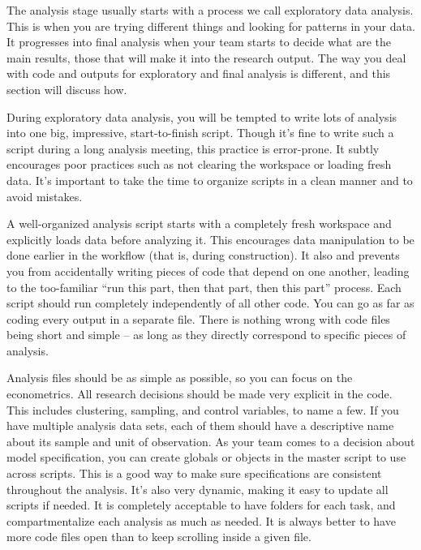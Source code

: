 The analysis stage usually starts with a process we call exploratory data analysis.
This is when you are trying different things and looking for patterns in your data. 
It progresses into final analysis when your team starts to decide what are the main results, those that will make it into the research output.
The way you deal with code and outputs for exploratory and final analysis is different, and this section will discuss how.

During exploratory data analysis, you will be tempted to write lots of analysis into one big, impressive, start-to-finish script. 
Though it's fine to write such a script during a long analysis meeting, this practice is error-prone.  
It subtly encourages poor practices such as not clearing the workspace or loading fresh data. 
It's important to take the time to organize scripts in a clean manner and to avoid mistakes.

A well-organized analysis script starts with a completely fresh workspace and explicitly loads data before analyzing it.
This encourages data manipulation to be done earlier in the workflow (that is, during construction).
It also and prevents you from accidentally writing pieces of code that depend on one another, leading to the too-familiar ``run this part, then that part, then this part'' process.
Each script should run completely independently of all other code.
You can go as far as coding every output in a separate file.
There is nothing wrong with code files being short and simple -- as long as they directly correspond to specific pieces of analysis.

Analysis files should be as simple as possible, so you can focus on the econometrics.
All research decisions should be made very explicit in the code.
This includes clustering, sampling, and control variables, to name a few. 
If you have multiple analysis data sets, each of them should have a descriptive name about its sample and unit of observation.
As your team comes to a decision about model specification, you can create globals or objects in the master script to use across scripts.
This is a good way to make sure specifications are consistent throughout the analysis. It's also very dynamic, making it easy to update all scripts if needed.
It is completely acceptable to have folders for each task, and compartmentalize each analysis as much as needed.
It is always better to have more code files open than to keep scrolling inside a given file.

